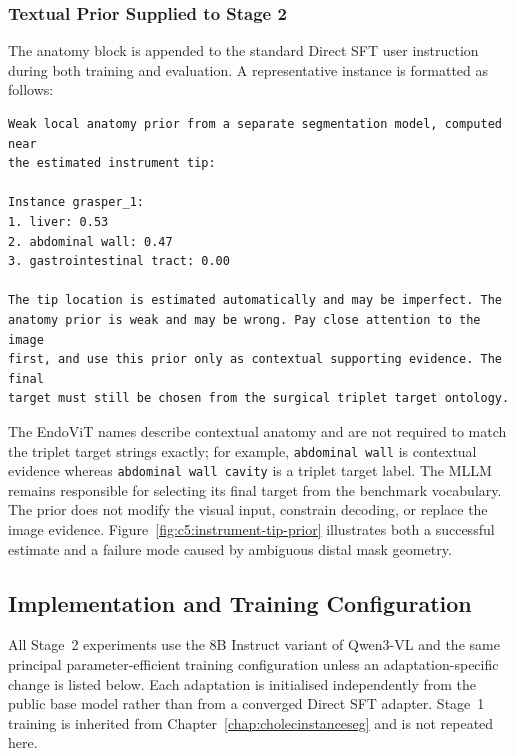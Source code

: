 \subsubsection{Textual Prior Supplied to Stage 2}

The anatomy block is appended to the standard Direct SFT user instruction during both training and evaluation. A representative instance is formatted as follows:

\begin{lstlisting}[style=c5prompt]
Weak local anatomy prior from a separate segmentation model, computed near
the estimated instrument tip:

Instance grasper_1:
1. liver: 0.53
2. abdominal wall: 0.47
3. gastrointestinal tract: 0.00

The tip location is estimated automatically and may be imperfect. The
anatomy prior is weak and may be wrong. Pay close attention to the image
first, and use this prior only as contextual supporting evidence. The final
target must still be chosen from the surgical triplet target ontology.
\end{lstlisting}

The EndoViT names describe contextual anatomy and are not required to match the triplet target strings exactly; for example, \texttt{abdominal wall} is contextual evidence whereas \texttt{abdominal wall cavity} is a triplet target label. The MLLM remains responsible for selecting its final target from the benchmark vocabulary. The prior does not modify the visual input, constrain decoding, or replace the image evidence. Figure~\ref{fig:c5:instrument-tip-prior} illustrates both a successful estimate and a failure mode caused by ambiguous distal mask geometry.

\fi
\ifcFiveTraining
\subsection{Implementation and Training Configuration}
\label{sec:c5:appendix-training}

All Stage~2 experiments use the 8B Instruct variant of Qwen3-VL and the same principal parameter-efficient training configuration unless an adaptation-specific change is listed below. Each adaptation is initialised independently from the public base model rather than from a converged Direct SFT adapter. Stage~1 training is inherited from Chapter~\ref{chap:cholecinstanceseg} and is not repeated here.

